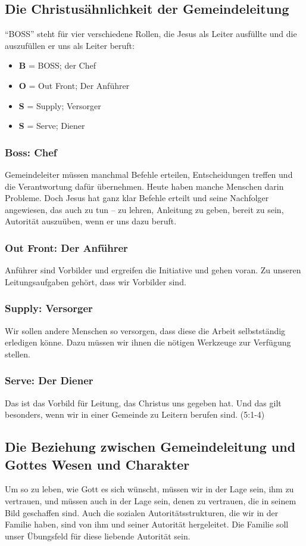 \documentclass{../../inc/mybib}
\begin{document}
\subsection{Die Christusähnlichkeit der Gemeindeleitung}
\enquote{BOSS} steht für vier verschiedene Rollen, die Jesus als Leiter ausfüllte und die auszufüllen er uns als Leiter beruft:
\begin{itemize}
    \item \textbf{B} = BOSS; der Chef
    \item \textbf{O} = Out Front; Der Anführer
    \item \textbf{S} = Supply; Versorger
    \item \textbf{S} = Serve; Diener
\end{itemize}
\subsubsection{Boss: Chef}
Gemeindeleiter müssen manchmal Befehle erteilen, Entscheidungen treffen und die Verantwortung dafür übernehmen. Heute haben manche Menschen darin Probleme. Doch Jesus hat ganz klar Befehle erteilt und seine Nachfolger angewiesen, das auch zu tun -- zu lehren, Anleitung zu geben, bereit zu sein, Autorität auszuüben, wenn er uns dazu beruft.
\subsubsection{Out Front: Der Anführer}
Anführer sind Vorbilder und ergreifen die Initiative und gehen voran. Zu unseren Leitungsaufgaben gehört, dass wir Vorbilder sind.
\subsubsection{Supply: Versorger}
Wir sollen andere Menschen so versorgen, dass diese die Arbeit selbstständig erledigen könne. Dazu müssen wir ihnen die nötigen Werkzeuge zur Verfügung stellen.
\subsubsection{Serve: Der Diener}
Das ist das Vorbild für Leitung, das Christus uns gegeben hat. Und das gilt besonders, wenn wir in einer Gemeinde zu Leitern berufen sind. (5:1-4)
\subsection{Die Beziehung zwischen Gemeindeleitung und Gottes Wesen und Charakter}
Um so zu leben, wie Gott es sich wünscht, müssen wir in der Lage sein, ihm zu vertrauen, und müssen auch in der Lage sein, denen zu vertrauen, die in seinem Bild geschaffen sind. Auch die sozialen Autoritätsstrukturen, die wir in der Familie haben, sind von ihm und seiner Autorität hergeleitet. Die Familie soll unser Übungsfeld für diese liebende Autorität sein.
\end{document}
